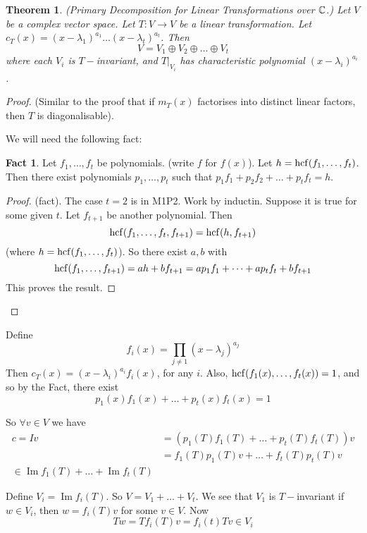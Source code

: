 \documentclass{article}
\newtheorem{theorem}{Theorem}
\theoremstyle{definition} \newtheorem*{definition}{Definition}
\newtheorem*{fact}{Fact}
\newcommand{\mt}{m_T}
\newcommand{\ct}{c_T}
\DeclareMathOperator{\Ima}{Im} \DeclareMathOperator{\Sym}{Sym}
\begin{document}
\begin{theorem}
  (Primary Decomposition for Linear Transformations over $\mathbb{C}$.)
  Let $V$ be a complex vector space. Let $T:V \rightarrow V$ be a linear
  transformation. 
  Let $\ct(x)=(x-\lambda_1)^{a_1}\dots(x-\lambda_t)^{a_t}$. Then
  \[
  V = V_1 \oplus V_2 \oplus \dots \oplus V_t
  \]
  where each $V_i$ is $T-$invariant, and $T|_{V_i}$ has characteristic
  polynomial $(x-\lambda_i)^{a_i}$.
  \label{primdecomplintrans}
\end{theorem}

\begin{proof}
  (Similar to the proof that if $\mt(x)$ factorises into distinct 
  linear factors, then $T$ is diagonalisable).

  We will need the following fact:

  \begin{fact}
    Let $f_1,\dots,f_t$ be polynomials. (write $f$ for $f(x)$). Let
    $h=\operatorname{hcf}(f_1,\dots,f_t)$. Then there exist polynomials 
    $p_1,\dots,p_t$ such that $p_1f_1 + p_2f_2 + \dots + p_tf_t=h$.
  \end{fact}

  \begin{proof}
    (fact). The case $t=2$ is in M1P2. Work by inductin. Suppose it is 
    true
    for some given $t$. Let $f_{t+1}$ be another polynomial. Then
    \[
      \operatorname{hcf}(f_1,\dots,f_t,f_{t+1})=\operatorname{hcf}(h,f_{t+1})
    \]
    (where $h=\operatorname{hcf}(f_1,\dots,f_{t})$). So there exist
    $a,b$ with $$\operatorname{hcf}(f_1,\dots,f_{t+1})=ah+bf_{t+1}=ap_1f_1+\dots+
    ap_tf_t+bf_{t+1}$$
    This proves the result.
  \end{proof}
\end{proof}

Define 
\[
  f_i(x) = \prod_{j\neq 1}(x-\lambda_j)^{a_j}
\]
Then $\ct(x)=(x-\lambda_i)^{a_i}f_i(x)$, for any $i$. Also,
$\operatorname{hcf}(f_1(x),\dots,f_t(x))=1$, and so by the Fact, there exist
$$p_1(x)f_1(x)+\dots+p_t(x)f_t(x)=1$$

So $\forall v \in V$ we have
\begin{align*}
  c = Iv &= (p_1(T)f_1(T)+\dots+p_t(T)f_t(T))v\\
  &= f_1(T)p_1(T)v + \dots + f_t(T)p_t(T)v\\
  \in \Ima f_1(T)+ \dots + \Ima f_t(T)
\end{align*}

Define $V_i  = \Ima f_i(T)$. So $V = V_1 + \dots + V_t$. We see that $V_1$
is $T-$invariant if $w \in V_i$, then $w = f_i(T)v$ for some $v \in V$.
Now 
\[
  Tw = Tf_i(T)v = f_i(t)Tv \in V_i
\]
\end{document}
